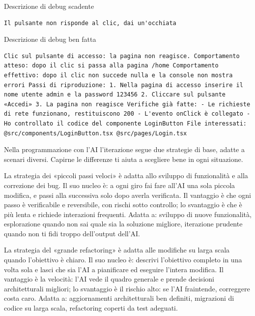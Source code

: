 Descrizione di debug scadente

\begin{lstlisting}
Il pulsante non risponde al clic, dai un'occhiata
\end{lstlisting}

Descrizione di debug ben fatta

\begin{lstlisting}
Clic sul pulsante di accesso: la pagina non reagisce. Comportamento atteso: dopo il clic si passa alla pagina /home Comportamento effettivo: dopo il clic non succede nulla e la console non mostra errori Passi di riproduzione: 1. Nella pagina di accesso inserire il nome utente admin e la password 123456 2. Cliccare sul pulsante «Accedi» 3. La pagina non reagisce Verifiche già fatte: - Le richieste di rete funzionano, restituiscono 200 - L'evento onClick è collegato - Ho controllato il codice del componente LoginButton File interessati: @src/components/LoginButton.tsx @src/pages/Login.tsx
\end{lstlisting}


Nella programmazione con l'AI l'iterazione segue due strategie di base, adatte a scenari diversi. Capirne le differenze ti aiuta a scegliere bene in ogni situazione.

La strategia dei «piccoli passi veloci» è adatta allo sviluppo di funzionalità e alla correzione dei bug. Il suo nucleo è: a ogni giro fai fare all'AI una sola piccola modifica, e passi alla successiva solo dopo averla verificata. Il vantaggio è che ogni passo è verificabile e reversibile, con rischi sotto controllo; lo svantaggio è che è più lenta e richiede interazioni frequenti. Adatta a: sviluppo di nuove funzionalità, esplorazione quando non sai quale sia la soluzione migliore, iterazione prudente quando non ti fidi troppo dell'output dell'AI.

La strategia del «grande refactoring» è adatta alle modifiche su larga scala quando l'obiettivo è chiaro. Il suo nucleo è: descrivi l'obiettivo completo in una volta sola e lasci che sia l'AI a pianificare ed eseguire l'intera modifica. Il vantaggio è la velocità: l'AI vede il quadro generale e prende decisioni architetturali migliori; lo svantaggio è il rischio alto: se l'AI fraintende, correggere costa caro. Adatta a: aggiornamenti architetturali ben definiti, migrazioni di codice su larga scala, refactoring coperti da test adeguati.

